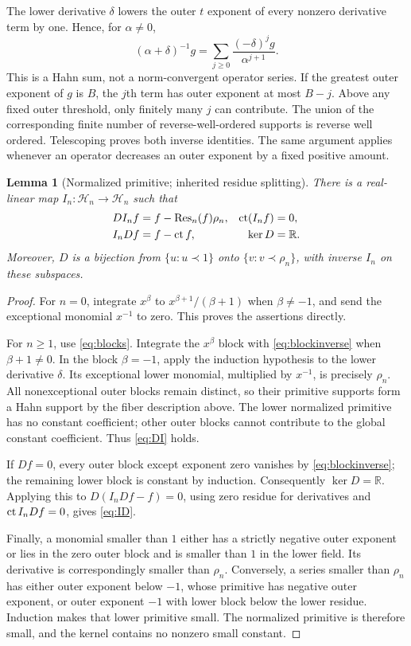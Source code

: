 \documentclass[11pt,a4paper]{article}
\numberwithin{equation}{section}
\newtheorem{lemma}[theorem]{Lemma}
\theoremstyle{definition}
\theoremstyle{remark}\newtheorem{remark}[theorem]{Remark}
\newcommand{\R}{\mathbb R}\newcommand{\C}{\mathbb C}
\newcommand{\Hh}{\mathcal H}\newcommand{\Ll}{\mathcal L}
\newcommand{\Res}{\operatorname{Res}}\newcommand{\supp}{\operatorname{supp}}
\begin{document}
The lower derivative $\delta$ lowers the outer $t$ exponent of every nonzero derivative term by one. Hence, for $\alpha\ne0$,
\begin{equation}
 (\alpha+\delta)^{-1}g
 =\sum_{j\ge0}\frac{(-\delta)^j g}{\alpha^{j+1}}.
 \label{eq:blockinverse}
\end{equation}
This is a Hahn sum, not a norm-convergent operator series. If the greatest outer exponent of $g$ is $B$, the $j$th term has outer exponent at most $B-j$. Above any fixed outer threshold, only finitely many $j$ can contribute. The union of the corresponding finite number of reverse-well-ordered supports is reverse well ordered. Telescoping proves both inverse identities. The same argument applies whenever an operator decreases an outer exponent by a fixed positive amount.

\begin{lemma}[Normalized primitive; inherited residue splitting]
\label{lem:primitive}
There is a real-linear map $I_n:\Hh_n\to\Hh_n$ such that
\begin{align}
 D I_n f&=f-\Res_n(f)\rho_n,&\ct(I_n f)&=0,\label{eq:DI}\\
 I_n D f&=f-\ct f,&\ker D&=\R.\label{eq:ID}
\end{align}
Moreover, $D$ is a bijection from $\{u:u\prec1\}$ onto $\{v:v\prec\rho_n\}$, with inverse $I_n$ on these subspaces.
\end{lemma}
\begin{proof}
For $n=0$, integrate $x^\beta$ to $x^{\beta+1}/(\beta+1)$ when $\beta\ne-1$, and send the exceptional monomial $x^{-1}$ to zero. This proves the assertions directly.

For $n\ge1$, use \eqref{eq:blocks}. Integrate the $x^\beta$ block with \eqref{eq:blockinverse} when $\beta+1\ne0$. In the block $\beta=-1$, apply the induction hypothesis to the lower derivative $\delta$. Its exceptional lower monomial, multiplied by $x^{-1}$, is precisely $\rho_n$. All nonexceptional outer blocks remain distinct, so their primitive supports form a Hahn support by the fiber description above. The lower normalized primitive has no constant coefficient; other outer blocks cannot contribute to the global constant coefficient. Thus \eqref{eq:DI} holds.

If $Df=0$, every outer block except exponent zero vanishes by \eqref{eq:blockinverse}; the remaining lower block is constant by induction. Consequently $\ker D=\R$. Applying this to $D(I_nDf-f)=0$, using zero residue for derivatives and $\operatorname{ct} I_nDf=0$, gives \eqref{eq:ID}.

Finally, a monomial smaller than $1$ either has a strictly negative outer exponent or lies in the zero outer block and is smaller than $1$ in the lower field. Its derivative is correspondingly smaller than $\rho_n$. Conversely, a series smaller than $\rho_n$ has either outer exponent below $-1$, whose primitive has negative outer exponent, or outer exponent $-1$ with lower block below the lower residue. Induction makes that lower primitive small. The normalized primitive is therefore small, and the kernel contains no nonzero small constant.
\end{proof}
\end{document}
